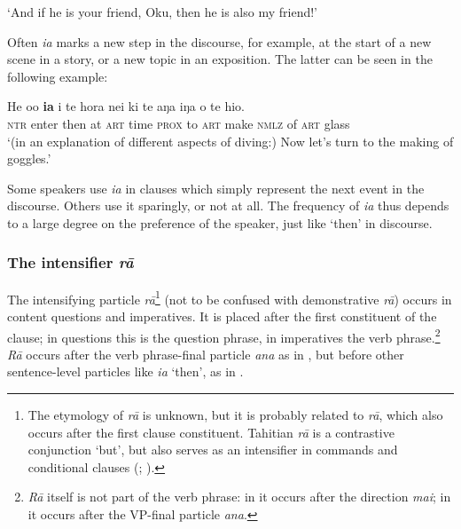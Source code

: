 \glt
‘And if he is your friend, Oku, then he is also my friend!’ \textstyleExampleref{[R535.151]} 
\z

Often \textit{ia} marks a new step in the discourse, for example, at the start of a new scene in a story, or a new topic in an exposition. The latter can be seen in the following example:

\ea\label{ex:4.175}
\gll He o{\ꞌ}o \textbf{ia} {\ꞌ}i te hora nei ki te aŋa iŋa o te hi{\ꞌ}o. \\
\textsc{ntr} enter then at \textsc{art} time \textsc{prox} to \textsc{art} make \textsc{nmlz} of \textsc{art} glass \\

\glt
‘(in an explanation of different aspects of diving:) Now let’s turn to the making of goggles.’ \textstyleExampleref{[R360.026]} 
\z

Some speakers use \textit{ia} in clauses which simply represent the next event in the discourse. Others use it sparingly, or not at all. The frequency of \textit{ia} thus depends to a large degree on the preference of the speaker, just like ‘then’ in  discourse.
\subsubsection[The intensifier rā]{The intensifier \textit{rā}}\label{sec:4.5.4.4}
The intensifying particle \textit{rā}\footnote{\label{fn:205}The etymology of \textit{rā} is unknown, but it is probably related to  \textit{rā}, which also occurs after the first clause constituent. Tahitian \textit{rā} is a contrastive conjunction ‘but’, but also serves as an intensifier in commands and conditional clauses (\citealt[98]{LazardPeltzer2000}; \citealt[399]{AcadémieTahitienne1999}).} (not to be confused with demonstrative \textit{rā}) occurs in content questions and imperatives. It is placed after the first constituent of the clause; in questions this is the question phrase, in imperatives the verb phrase.\footnote{\label{fn:206}\textit{Rā} itself is not part of the verb phrase: in  it occurs after the direction \textit{mai}; in  it occurs after the VP{}-final particle \textit{{\ꞌ}ana}.} \textit{Rā} occurs after the verb phrase-final particle \textit{{\ꞌ}ana} as in , but before other sentence-level particles like \textit{ia} ‘then’, as in .

